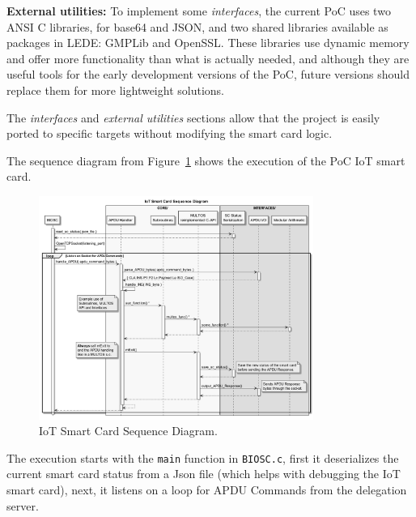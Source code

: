 \hfil

\textbf{External utilities:} To implement some \textit{interfaces}, the current PoC uses two ANSI C libraries, for base64 and JSON, and two shared libraries available as packages in LEDE: GMPLib and OpenSSL. These libraries use dynamic memory and offer more functionality than what is actually needed, and although they are useful tools for the early development versions of the PoC, future versions should replace them for more lightweight solutions.

\hfil

The \textit{interfaces} and \textit{external utilities} sections  allow that the project is easily ported to specific targets without modifying the smart card logic.


\hfil


The sequence diagram from Figure~\ref{fig:sequenceBIOSC} shows the execution of the PoC IoT smart card.



\begin{figure}[bth]
	\begin{center}
		\includegraphics[width=0.8\textwidth]{gfx/UML/sequenceBIOSC}
	\end{center}
	\caption{IoT Smart Card Sequence Diagram.}
	\label{fig:sequenceBIOSC}
\end{figure}



The execution starts with the \texttt{main} function in \texttt{BIOSC.c}, first it deserializes the current smart card status from a Json file (which helps with debugging the IoT smart card), next, it listens on a loop for APDU Commands from the delegation server.

